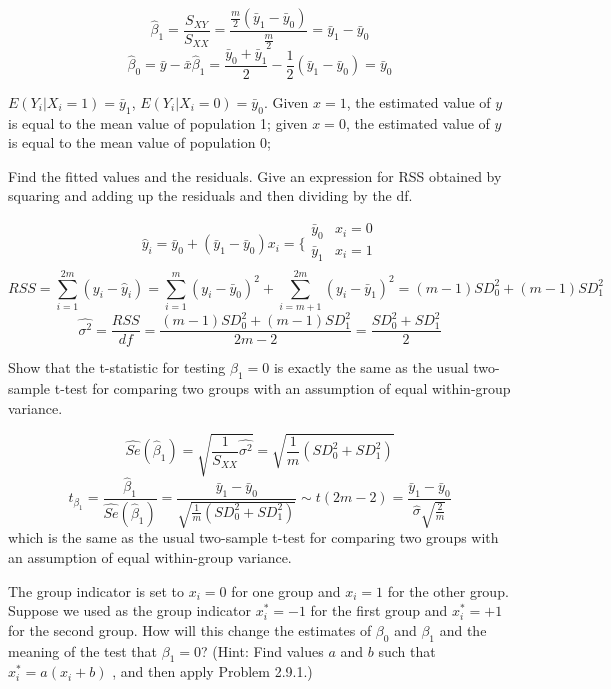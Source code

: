 \documentclass[12pt,oneside,a4paper]{article}\usepackage[]{graphicx}\usepackage[]{xcolor}
\newenvironment{problem}[2][Problem]{\begin{trivlist}
\item[\hskip \labelsep {\bfseries #1}\hskip \labelsep {\bfseries #2.}]}{\end{trivlist}}
\begin{document}
$$\hat{\beta}_{1} = \frac{S_{XY}}{S_{XX}} = \frac{\frac{m}{2}(\bar{y}_{1} - \bar{y}_{0})}{\frac{m}{2}} = \bar{y}_{1} - \bar{y}_{0}$$
$$\hat{\beta}_{0} = \bar{y} - \bar{x}\hat{\beta}_{1} = \frac{\bar{y}_{0} + \bar{y}_{1}}{2} - \frac{1}{2}(\bar{y}_{1} - \bar{y}_{0}) = \bar{y}_{0}$$

$E(Y_{i}| X_{i} = 1) = \bar{y}_{1}$, $E(Y_{i}| X_{i} = 0) = \bar{y}_{0}$. Given $x = 1$, the estimated value of $y$ is equal to the mean value of population 1; given $x = 0$, the estimated value of $y$ is equal to the mean value of population 0;

\begin{problem}{2.10.3}
Find the fitted values and the residuals. Give an expression for RSS obtained by squaring and adding up the residuals and then dividing by the df.
\end{problem}

$$\hat{y}_{i} = \bar{y}_{0} + (\bar{y}_{1} - \bar{y}_{0})x_{i} = \Big\{ 
\begin{matrix}
  \bar{y}_{0} & x_{i} = 0  \\
  \bar{y}_{1} & x_{i} = 1 \\
 \end{matrix}$$
$$RSS = \sum_{i = 1}^{2m}{(y_{i} - \hat{y}_{i})} = \sum_{i = 1}^{m}{(y_{i} - \bar{y}_{0})^2} + \sum_{i = m+1}^{2m}{(y_{i} - \bar{y}_{1})^2} = (m - 1)SD_{0}^{2} + (m - 1)SD_{1}^{2}$$
$$\hat{\sigma^2} = \frac{RSS}{df} = \frac{(m - 1)SD_{0}^{2} + (m - 1)SD_{1}^{2}}{2m - 2} = \frac{SD_{0}^{2} + SD_{1}^{2}}{2}$$

\begin{problem}{2.10.4}
Show that the t-statistic for testing $\beta_{1} = 0$ is exactly the same as the usual two-sample t-test for comparing two groups with an assumption of equal within-group variance.
\end{problem}

$$\hat{Se}(\hat{\beta}_{1}) = \sqrt{\frac{1}{S_{XX}}\hat{\sigma^2}} = \sqrt{\frac{1}{m}(SD_{0}^{2} + SD_{1}^{2})}$$
$$t_{\beta_{1}} = \frac{\hat{\beta}_{1}}{\hat{Se}(\hat{\beta}_{1})} = \frac{\bar{y}_{1} - \bar{y}_{0}}{\sqrt{\frac{1}{m}(SD_{0}^{2} + SD_{1}^{2})}} \sim t(2m -2) = \frac{\bar{y}_{1} - \bar{y}_{0}}{\hat{\sigma}\sqrt{\frac{2}{m}}}$$
which is the same as the usual two-sample t-test for comparing two groups with an assumption of equal within-group variance.

\begin{problem}{2.10.5}
The group indicator is set to $x_{i} = 0$ for one group and $x_{i}  = 1$ for the other group. Suppose we used as the group indicator $x_{i}^{*} = -1$ for the first group and $x_{i}^{*} = +1$ for the second group. How will this change the estimates of $\beta_{0}$ and $\beta_{1}$ and the meaning of the test that $\beta_{1} = 0$? (Hint: Find values $a$ and $b$ such that $x_{i}^{*} = a(x_{i} + b)$ , and then apply Problem 2.9.1.)
\end{problem}
\end{document}
